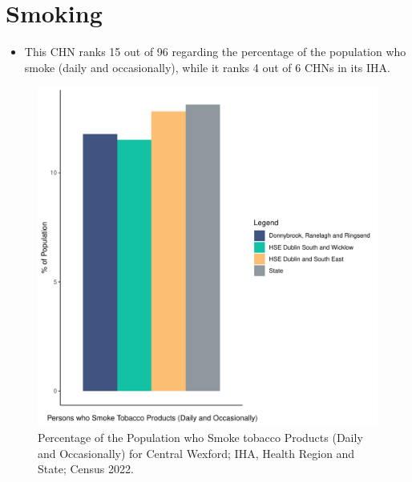 \documentclass{article}
\begin{document}
\pagebreak

\section{Smoking}\label{sect:Smoking}
\begin{itemize}
\item This CHN ranks  15 out of 96 regarding the percentage of the population who smoke (daily and occasionally), while it ranks   4 out of 6 CHNs in its IHA.
\end{itemize}
\begin{figure}[H]
	\centering
	\includegraphics[width = 120mm]{../figures/SmokingED.pdf}
	\caption{Percentage of the Population who Smoke tobacco Products (Daily and Occasionally) for Central Wexford; IHA, Health Region and State; Census 2022.}
	\label{fig:2ae19629-1a6a-13a3-e055-000000000001}
	\end{figure}
	
\end{document}
